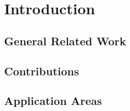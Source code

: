 
\chapter{Introduction}


\section{General Related Work}



\section{Contributions}



\section{Application Areas}


\cleardoublepage
